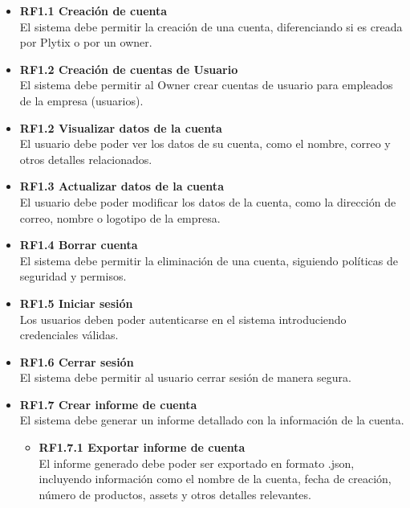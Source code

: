 \documentclass[12pt.a4paper]{article}
\begin{document}
\begin{itemize}
    \item \textbf{RF1.1 Creación de cuenta} \\
    El sistema debe permitir la creación de una cuenta, diferenciando si es creada por Plytix o por un owner.

    \item \textbf{RF1.2 Creación de cuentas de Usuario} \\
    El sistema debe permitir al Owner crear cuentas de usuario para empleados de la empresa (usuarios).

    \item \textbf{RF1.2 Visualizar datos de la cuenta} \\
    El usuario debe poder ver los datos de su cuenta, como el nombre, correo y otros detalles relacionados.

    \item \textbf{RF1.3 Actualizar datos de la cuenta} \\
    El usuario debe poder modificar los datos de la cuenta, como la dirección de correo, nombre o logotipo de la empresa.

    \item \textbf{RF1.4 Borrar cuenta} \\
    El sistema debe permitir la eliminación de una cuenta, siguiendo políticas de seguridad y permisos.

    \item \textbf{RF1.5 Iniciar sesión} \\
    Los usuarios deben poder autenticarse en el sistema introduciendo credenciales válidas.

    \item \textbf{RF1.6 Cerrar sesión} \\
    El sistema debe permitir al usuario cerrar sesión de manera segura.

    \item \textbf{RF1.7 Crear informe de cuenta} \\
    El sistema debe generar un informe detallado con la información de la cuenta.
    \begin{itemize}
        \item \textbf{RF1.7.1 Exportar informe de cuenta} \\
        El informe generado debe poder ser exportado en formato .json, incluyendo información como el nombre de la cuenta, fecha de creación, número de productos, assets y otros detalles relevantes.
    \end{itemize}


\end{itemize}
\end{document}
